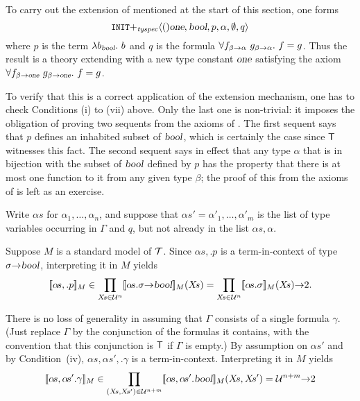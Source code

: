  To carry out the extension of 
mentioned at the start of this section, one forms
\[
\hbox{{\small\tt INIT}}{+_{\it tyspec}} \langle
()\textsl{one},\textsl{bool},p,\alpha,\emptyset,q\rangle
\]
where $p$ is the term $\lambda b_{\textsl{bool}}.\ b$ and $q$ is the formula
$\uquant{f_{\beta\fun\alpha}\ g_{\beta\fun\alpha}}f=g$. Thus the
result is a theory extending  with a
new type constant $\textsl{one}$ satisfying the axiom
$\uquant{f_{\beta\fun\ty{one}}\ g_{\beta\fun\ty{one}}}f=g$.

To verify that this is a correct application of the extension
mechanism, one has to check Conditions (i) to (vii) above. Only the last
one is non-trivial: it imposes the obligation of proving
two sequents from the axioms of . The first sequent says
that $p$ defines an inhabited subset of $\textsl{bool}$, which is certainly
the case since ${\sf T}$ witnesses this fact. The second sequent says in
effect that any type $\alpha$ that is in bijection with the subset of
$\textsl{bool}$ defined by $p$ has the property that there is at most one
function to it from any given type $\beta$; the proof of this from the
axioms of  is left as an exercise.

\medskip


\medskip

Write $\alpha\!s$ for $\alpha_1,\ldots,\alpha_n$, and suppose that
$\alpha\!s'={\alpha'}_1,\ldots,{\alpha'}_m$ is the list of type
variables occurring in $\Gamma$ and $q$, but not already in the list
$\alpha\!s,\alpha$.

Suppose $M$ is a standard model of ${\cal T}$. Since $\alpha\!s,.p$ is
a term-in-context of type $\sigma{\to}\textsl{bool}$, interpreting it in
$M$ yields
\[
\den{\alpha\!s,.p}_{M}
\in \prod_{X\!s\in{\cal U}^{n}}\den{\alpha\!s.\sigma\fun\ty{bool}}_M(X\!s)
= \prod_{X\!s\in{\cal U}^{n}}
   \den{\alpha\!s.\sigma}_M(X\!s)\fun\two .
\]

There is no loss of generality in assuming that $\Gamma$ consists of a
single formula $\gamma$. (Just replace $\Gamma$ by the conjunction of
the formulas it contains, with the convention that this conjunction is
${\sf T}$ if $\Gamma$ is empty.) By assumption on $\alpha\!s'$ and by
Condition~(iv), $\alpha\!s,\alpha\!s',.\gamma$ is a term-in-context.
Interpreting it in $M$ yields
\[
\den{\alpha\!s,\alpha\!s'.\gamma}_{M}
\in \prod_{(X\!s,X\!s')\in
{\cal U}^{n+m}}\den{\alpha\!s,\alpha\!s'.\ty{bool}}_M(X\!s,X\!s')
={\cal U}^{n+m}\fun\two
\]

